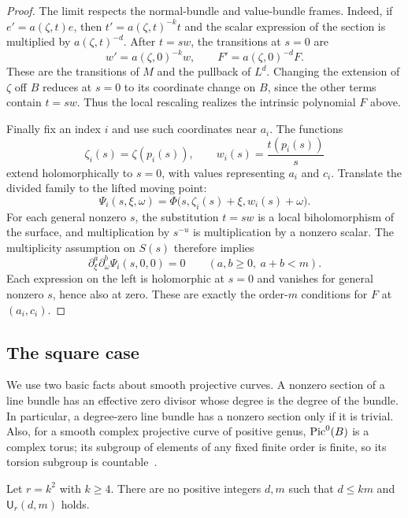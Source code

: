 \begin{proof}
The limit respects the normal-bundle and value-bundle frames.  Indeed, if $e'=a(\zeta,t)e$, then $t'=a(\zeta,t)^{-k}t$ and the scalar expression of the section is multiplied by $a(\zeta,t)^{-d}$. After $t=sw$, the transitions at $s=0$ are
\[
 w'=a(\zeta,0)^{-k}w,
 \qquad
 F'=a(\zeta,0)^{-d}F.
\]
These are the transitions of $M$ and the pullback of $L^d$. Changing the extension of $\zeta$ off $B$ reduces at $s=0$ to its coordinate change on $B$, since the other terms contain $t=sw$. Thus the local rescaling realizes the intrinsic polynomial $F$ above.

Finally fix an index $i$ and use such coordinates near $a_i$.  The functions
\[
 \zeta_i(s)=\zeta(p_i(s)),
 \qquad
 w_i(s)=\frac{t(p_i(s))}{s}
\]
extend holomorphically to $s=0$, with values representing $a_i$ and $c_i$.  Translate the divided family to the lifted moving point:
\[
 \Psi_i(s,\xi,\omega)
   =\Phi\bigl(s,\zeta_i(s)+\xi,w_i(s)+\omega\bigr).
\]
For each general nonzero $s$, the substitution $t=sw$ is a local biholomorphism of the surface, and multiplication by $s^{-u}$ is multiplication by a nonzero scalar.  The multiplicity assumption on $S(s)$ therefore implies
\[
 \partial_\xi^a\partial_\omega^b
 \Psi_i(s,0,0)=0
 \qquad(a,b\ge0,\ a+b<m).
\]
Each expression on the left is holomorphic at $s=0$ and vanishes for general nonzero $s$, hence also at zero.  These are exactly the order-$m$ conditions for $F$ at $(a_i,c_i)$.
\end{proof}

\subsection{The square case}

We use two basic facts about smooth projective curves.  A nonzero section of a line bundle has an effective zero divisor whose degree is the degree of the bundle.  In particular, a degree-zero line bundle has a nonzero section only if it is trivial.  Also, for a smooth complex projective curve of positive genus, $\mathrm{Pic}^0(B)$ is a complex torus; its subgroup of elements of any fixed finite order is finite, so its torsion subgroup is countable~\cite[Tag~\href{https://stacks.math.columbia.edu/tag/0C1Z}{0C1Z}]{Stacks}.

\begin{proposition}
\label{prop:squares}
Let $r=k^2$ with $k\ge4$.  There are no positive integers $d,m$ such that $d\le km$ and $\mathsf U_r(d,m)$ holds.
\end{proposition}


